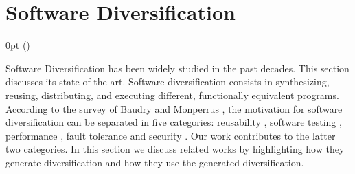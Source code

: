 \section{Software Diversification}
\label{sota:sota}
\def\checkmark{\tikz\fill[scale=0.4](0,.35) -- (.25,0) -- (1,.7) -- (.25,.15) -- cycle;} 

  {\topsep}%
  {\topsep}%
  {\itshape}%
  {0pt}%
  {\bfseries}%
  {}%
  { }%
  {()\textnormal{}}

\def\Gnospace~{G{}}
\theoremstyle{sota}
\newtheorem{goal}{G}
\providecommand*{\definitionautorefname}{\Gnospace}
\newcommand{\goalautorefname}{\Gnospace}


\def\Snospace~{S{}}
\theoremstyle{sota}
\newtheorem{strategy}{S}
\providecommand*{\definitionautorefname}{\Snospace}
\newcommand{\strategyautorefname}{\Snospace}

\def\Unospace~{U{}}
\theoremstyle{sota}
\newtheorem{usage}{U}
\providecommand*{\definitionautorefname}{\Unospace}
\newcommand{\usageautorefname}{\Unospace}









Software Diversification has been widely studied in the past decades. This section discusses its state of the art.
Software diversification consists in synthesizing, reusing, distributing, and executing different, functionally equivalent programs. 
According to the survey of Baudry and Monperrus \cite{natural_diversity}, the motivation for software diversification can be separated in five categories: reusability \cite{pohl2005software}, software testing \cite{Chen2010AdaptiveRT}, performance \cite{10.1145/2025113.2025133}, fault tolerance \cite{1659219} and security \cite{cohen1993operating}. Our work contributes to the latter two categories. In this section we discuss related works by highlighting how they generate diversification and how they use the generated diversification. 

